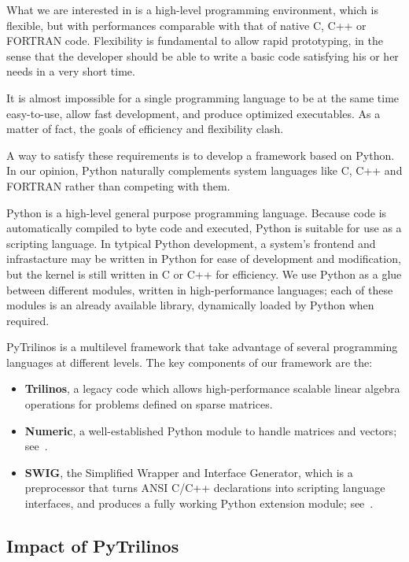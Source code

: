 \documentclass[10pt,relax]{SANDreport}
\newcommand{\PyTrilinos}{{PyTrilinos}}
\begin{document}
What we are interested in is a high-level programming environment, which is
flexible, but with performances comparable with that of native C, C++ or
FORTRAN code. Flexibility is fundamental to allow rapid prototyping, in the
sense that the developer should be able to write a basic code satisfying his
or her needs in a very short time. 

It is almost impossible for a single
programming language to be at the same time easy-to-use, allow fast
development, and produce optimized executables. As a matter of fact, the
goals of efficiency and flexibility clash. 

A way to satisfy these requirements is to develop a framework based on Python.
In our opinion, Python naturally complements system
languages like C, C++ and FORTRAN rather than competing with them.

Python is a high-level general purpose programming language. Because code is
automatically compiled to byte code and executed, Python is suitable for use
as a scripting language.  In tytpical Python development, a system's frontend
and infrastacture may be written in Python for ease of development and
modification, but the kernel is still written in C or C++ for efficiency.  We
use Python as a glue between different modules, written in high-performance
languages; each of these modules is an already available library, dynamically
loaded by Python when required.

PyTrilinos is a multilevel framework that take advantage of several
programming languages at different levels. 
The key components of our framework are the:
\begin{itemize}
\item {\bf Trilinos}, a legacy code which allows high-performance scalable
linear algebra operations for problems defined on sparse matrices. 
\item {\bf Numeric}, a well-established Python module to handle matrices and
vectors; see~\cite{numeric}.
\item {\bf SWIG}, the Simplified Wrapper and Interface Generator, which
is a  preprocessor
that turns ANSI C/C++ declarations into scripting language interfaces, and
produces a fully working Python extension module; see~\cite{swig}.
\end{itemize}

\subsection{Impact of \PyTrilinos}
\label{sec:impact}
\end{document}
